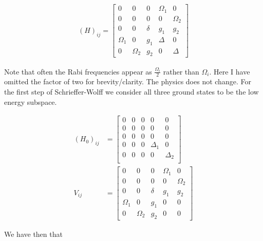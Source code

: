 \documentclass[12pt]{article}
\begin{document}
\begin{equation}
\begin{split}
(H)_{ij} = \begin{bmatrix}
0 & 0 & 0 & \Omega_1 & 0\\
0 & 0 & 0 & 0 & \Omega_2\\
0 & 0 & \delta & g_1 & g_2\\
\Omega_1 & 0 & g_1 & \Delta & 0\\
0 & \Omega_2 & g_2 & 0 & \Delta
\end{bmatrix}
\end{split}
\end{equation}

Note that often the Rabi frequencies appear as $\frac{\Omega_i}{2}$ rather than $\Omega_i$. Here I have omitted the factor of two for brevity/clarity. The physics does not change.
For the first step of Schrieffer-Wolff we consider all three ground states to be the low energy subspace.

\begin{equation}
\begin{split}
(H_0)_{ij} &= \begin{bmatrix}
0 & 0 & 0 & 0 & 0\\
0 & 0 & 0 & 0 & 0\\
0 & 0 & 0 & 0 & 0\\
0 & 0 & 0 & \Delta_1 & 0\\
0 & 0 & 0 & 0 & \Delta_2\\
\end{bmatrix}\\
V_{ij} & = \begin{bmatrix}
0 & 0 & 0 & \Omega_1 & 0\\
0 & 0 & 0 & 0 & \Omega_2\\
0 & 0 & \delta & g_1 & g_2\\
\Omega_1 & 0 & g_1 & 0 & 0\\
0 & \Omega_2 & g_2 & 0 & 0
\end{bmatrix}
\end{split}
\end{equation}

We have then that
\end{document}
